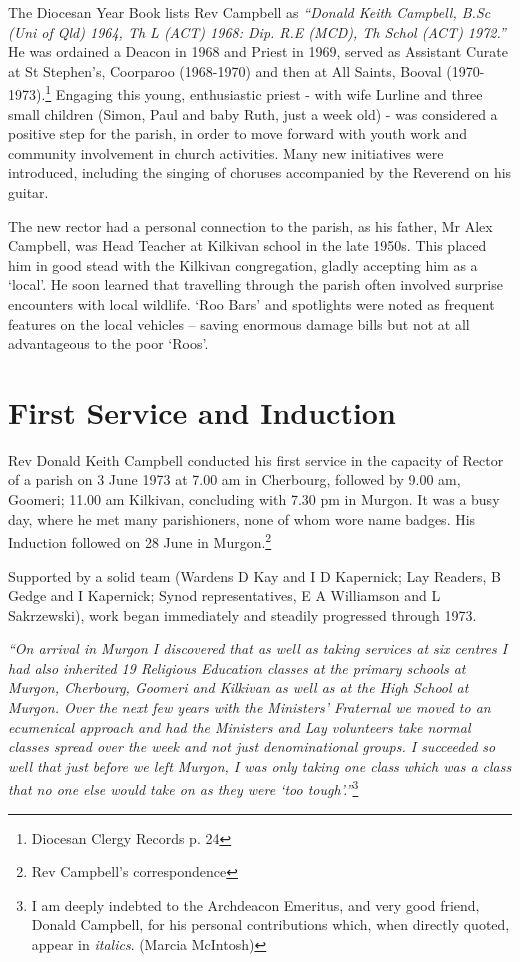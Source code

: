 The Diocesan Year Book lists Rev Campbell as \emph{``Donald Keith Campbell, B.Sc (Uni of Qld) 1964, Th L (ACT) 1968: Dip. R.E (MCD), Th Schol (ACT) 1972.''} He was ordained a Deacon in 1968 and Priest in 1969, served as Assistant Curate at St Stephen's, Coorparoo (1968-1970) and then at All Saints, Booval (1970-1973).\footnote{Diocesan Clergy Records p. 24} Engaging this young, enthusiastic priest - with wife Lurline and three small children (Simon, Paul and baby Ruth, just a week old) - was considered a positive step for the parish, in order to move forward with youth work and community involvement in church activities. Many new initiatives were introduced, including the singing of choruses accompanied by the Reverend on his guitar.


The new rector had a personal connection to the parish, as his father, Mr Alex Campbell, was Head Teacher at Kilkivan school in the late 1950s. This placed him in good stead with the Kilkivan congregation, gladly accepting him as a `local'. He soon learned that travelling through the parish often involved surprise encounters with local wildlife. `Roo Bars' and spotlights were noted as frequent features on the local vehicles -- saving enormous damage bills but not at all advantageous to the poor `Roos'.



\section{First Service and Induction}



Rev Donald Keith Campbell conducted his first service in the capacity of Rector of a parish on 3 June 1973 at 7.00 am in Cherbourg, followed by 9.00 am, Goomeri; 11.00 am Kilkivan, concluding with 7.30 pm in Murgon. It was a busy day, where he met many parishioners, none of whom wore name badges. His Induction followed on 28 June in Murgon.\footnote{Rev Campbell's correspondence}


Supported by a solid team (Wardens D Kay and I D Kapernick; Lay Readers, B Gedge and I Kapernick; Synod representatives, E A Williamson and L Sakrzewski), work began immediately and steadily progressed through 1973.



\emph{``On arrival in Murgon I discovered that as well as taking services at six centres I had also inherited 19 Religious Education classes at the primary schools at Murgon, Cherbourg, Goomeri and Kilkivan as well as at the High School at Murgon. Over the next few years with the Ministers' Fraternal we moved to an ecumenical approach and had the Ministers and Lay volunteers take normal classes spread over the week and not just denominational groups. I succeeded so well that just before we left Murgon, I was only taking one class which was a class that no one else would take on as they were `too tough'.''}\footnote{I am deeply indebted to the Archdeacon Emeritus, and very good friend, Donald Campbell, for his personal contributions which, when directly quoted, appear in \emph{italics}. (Marcia McIntosh)}



